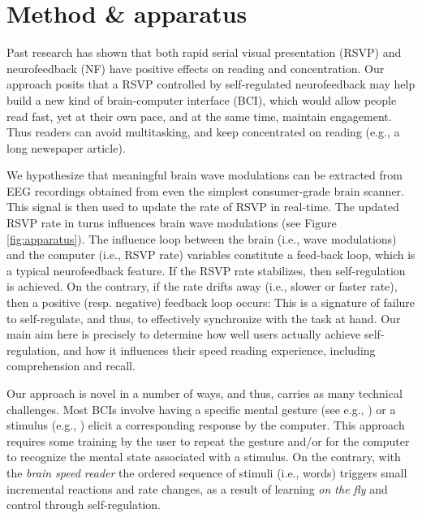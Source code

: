 \section{Method \& apparatus}
\label{method}
Past research has shown that both rapid serial visual presentation (RSVP) and neurofeedback (NF) have positive effects on reading and concentration. Our approach posits that a RSVP controlled by self-regulated neurofeedback may help build a new kind of brain-computer interface (BCI), which would allow people read fast, yet at their own pace, and at the same time, maintain engagement. Thus readers can avoid multitasking, and keep concentrated on reading (e.g., a long newspaper article).

We hypothesize that meaningful brain wave modulations can be extracted from EEG recordings obtained from even the simplest consumer-grade brain scanner. This signal is then used to update the rate of RSVP in real-time. The updated RSVP rate in turns influences brain wave modulations (see Figure \ref{fig:apparatus}). The influence loop between the brain (i.e., wave modulations) and the computer (i.e., RSVP rate) variables constitute a feed-back loop, which is a typical neurofeedback feature. If the RSVP rate stabilizes, then self-regulation is achieved. On the contrary, if the rate drifts away (i.e., slower or faster rate), then a positive (resp. negative) feedback loop occurs: This is a signature of failure to self-regulate, and thus, to effectively synchronize with the task at hand. Our main aim here is precisely to determine how well users actually achieve self-regulation, and how it influences their speed reading experience, including comprehension and recall.

Our approach is novel in a number of ways, and thus, carries as many technical challenges. Most BCIs involve having a specific mental gesture (see e.g., \cite{chuang2013ithink,jonhson2014mythoughts}) or a stimulus (e.g., \cite{}) elicit a corresponding response by the computer. This approach requires some training by the user to repeat the gesture and/or for the computer to recognize the mental state associated with a stimulus. On the contrary, with the {\it brain speed reader} the ordered sequence of stimuli (i.e., words) triggers small incremental reactions and rate changes, as a result of learning {\it on the fly} and control through self-regulation.

